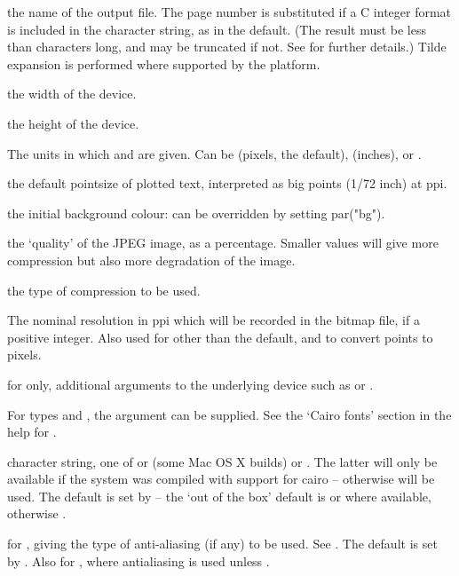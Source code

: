 %
\begin{Arguments}
\begin{ldescription}
\item[\code{filename}] the name of the output file.
The page number is substituted if a C integer format is included in
the character string, as in the default.  (The result must be less
than  characters long, and may be truncated if not.
See  for further details.)  Tilde expansion
is performed where supported by the platform.
\item[\code{width}] the width of the device.
\item[\code{height}] the height of the device.
\item[\code{units}] The units in which  and  are
given.  Can be  (pixels, the default),  (inches),
 or .
\item[\code{pointsize}] the default pointsize of plotted text, interpreted as
big points (1/72 inch) at  ppi.
\item[\code{bg}] the initial background colour: can be overridden by setting
par("bg").
\item[\code{quality}] the `quality' of the JPEG image, as a
percentage.  Smaller values will give more compression but also more
degradation of the image.
\item[\code{compression}] the type of compression to be used.
\item[\code{res}] The nominal resolution in ppi which will be recorded in the
bitmap file, if a positive integer.  Also used for 
other than the default, and to convert points to pixels.
\item[\code{...}] for  only, additional arguments to
the underlying  device such as  or
.

For types  and , the 
argument can be supplied.  See the `Cairo fonts'
section in the help for .

\item[\code{type}] character string, one of  or 
(some Mac OS X builds) or .  The latter will only be
available if the system was compiled with support for cairo --
otherwise  will be used.  The default is set by
 -- the `out of the box'
default is  or  where available,
otherwise .

\item[\code{antialias}] for , giving the type of
anti-aliasing (if any) to be used.  See .  The
default is set by .  Also for , where antialiasing is used unless .
\end{ldescription}
\end{Arguments}
